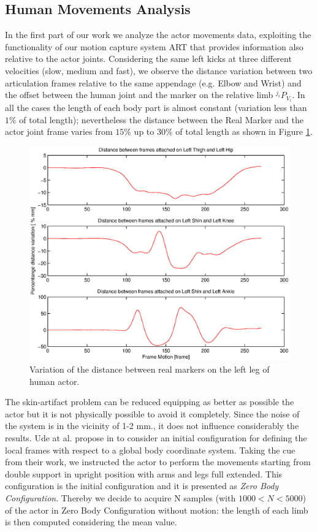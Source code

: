 \documentclass[a4paper, 10pt, conference]{ieeeconf}
\begin{document}
\subsection{Human Movements Analysis}
In the first part of our work we analyze the actor movements data, exploiting the functionality of our motion capture system ART that provides information also relative to the actor joints. Considering the same left kicks at three different velocities (slow, medium and fast), we observe the distance variation between two articulation frames relative to the same appendage (e.g. Elbow and Wrist) and the offset between the human joint and the marker on the relative limb $^{j_{i}}P_{V_{i}}$. In all the cases the length of each body part is almost constant (variation less than $1\%$ of total length); nevertheless the distance between the Real Marker and the actor joint frame varies from $15\%$ up to $30\%$ of total length as shown in Figure \ref{fig:distVariation}.
\begin{figure}[b]
		\includegraphics[width=\linewidth]{Figures/distVariation.eps} 
		\caption{Variation of the distance between real markers on the left leg of human actor.}
		\label{fig:distVariation}
\end{figure}
The skin-artifact problem can be reduced equipping as better as possible the actor but it is not physically possible to avoid it completely. Since the noise of the system is in the vicinity of 1-2 mm., it does not influence considerably the results. Ude at al. propose in \cite{Ude2000,Ude2004} to consider an initial configuration for defining the local frames with respect to a global body coordinate system. Taking the cue from their work, we instructed the actor to perform the movements starting from double support in upright position with arms and legs full extended. This configuration is the initial configuration and it is presented as \textit{Zero Body Configuration}.
Thereby we decide to acquire N samples (with $1000 < N < 5000$) of the actor in Zero Body Configuration without motion: the length of each limb is then computed considering the mean value. 
\end{document}
